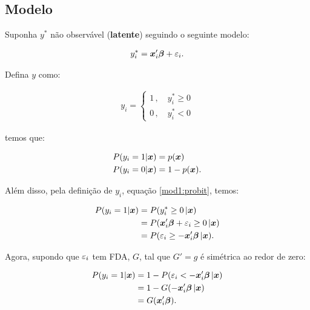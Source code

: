\documentclass[11pt, oneside, a4paper, article]{article}
\numberwithin{equation}{section}
\begin{document}
\begin{description}
	\subsection{Modelo}

	Suponha $y^{*}$ não observável (\textbf{latente}) seguindo o seguinte modelo:

	\vspace{-1 em}
	\begin{align} \label{mod1:probit}
		y_{i}^{*} = \boldsymbol{x}_{i}' \boldsymbol{\beta} + \varepsilon_{i}.
	\end{align}

	\noindent
	Defina $y$ como:

	\vspace{-1 em}
	\begin{align*}
		y_{i} =
		\begin{cases}
			1 \, , \quad y^{*}_{i} \geq 0
			\\
			0 \, , \quad y^{*}_{i} < 0
		\end{cases}
	\end{align*}

	\noindent
	temos que:

	\vspace{-1 em}
	\begin{align*}
		P( y_{i} = 1 | \boldsymbol{x} ) &= p( \boldsymbol{x} )
		\\
		P( y_{i} = 0 | \boldsymbol{x} ) &= 1 - p( \boldsymbol{x} ).
	\end{align*}

	Além disso, pela definição de $y_{i}$, equação \eqref{mod1:probit}, temos:

	\vspace{-1 em}
	\begin{align*}
		P( y_{i} = 1 | \boldsymbol{x} ) &= P(y_{i}^{*} \geq 0 \, | \boldsymbol{x} )
		\\
		&= P( \boldsymbol{x}_{i}' \boldsymbol{\beta} + \varepsilon_{i} \geq 0 \, | \boldsymbol{x} )
		\\
		&= P( \varepsilon_{i} \geq - \boldsymbol{x}_{i}' \boldsymbol{\beta}  \, | \boldsymbol{x} ).
	\end{align*}

	\noindent
	Agora, supondo que $\varepsilon_{i}$ tem FDA, $G$, tal que $G'=g$ é simétrica ao redor de zero:

	\vspace{-1 em}
	\begin{align*}
		P( y_{i} = 1 | \boldsymbol{x} ) 
		&= 1 - P( \varepsilon_{i} < - \boldsymbol{x}_{i}' \boldsymbol{\beta}  \, | \boldsymbol{x} )
		\\
		&= 1 - G( - \boldsymbol{x}_{i}' \boldsymbol{\beta}  \, | \boldsymbol{x} )
		\\
		&= G( \boldsymbol{x}_{i}' \boldsymbol{\beta} ).
	\end{align*}


\end{description}
\end{document}
